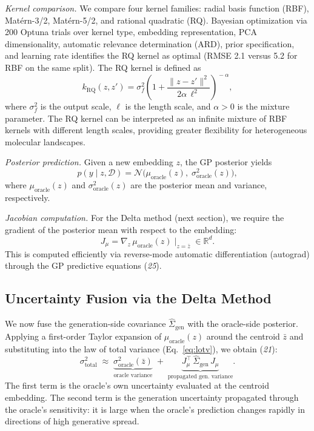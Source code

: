 \documentclass{article}
\newcommand{\Uoracle}{\sigma^{2}_{\mathrm{oracle}}}
\newcommand{\Utotal}{\sigma^{2}_{\mathrm{total}}}
\newcommand{\muoracle}{\mu_{\mathrm{oracle}}}
\newcommand{\Siggen}{\hat{\Sigma}_{\mathrm{gen}}}
\newcommand{\zbar}{\bar{z}}
\newcommand{\Rreal}{\mathbb{R}}
\newcommand{\Jmu}{J_{\mu}}
\newcommand{\scite}[1]{(\textit{#1})}
\begin{document}
\textit{Kernel comparison.}
We compare four kernel families: radial basis function (RBF),
Mat\'ern-3/2, Mat\'ern-5/2, and rational quadratic (RQ).  Bayesian
optimization via 200 Optuna trials over kernel type, embedding
representation, PCA dimensionality, automatic relevance determination
(ARD), prior specification, and learning rate identifies the RQ kernel as
optimal (RMSE 2.1 versus 5.2 for RBF on the same split).  The RQ kernel
is defined as
\begin{equation}
  k_{\mathrm{RQ}}(z,z')
  = \sigma_{f}^{2}\!
    \left(1 + \frac{\|z - z'\|^{2}}{2\alpha\,\ell^{2}}\right)^{\!-\alpha},
  \label{eq:rq}
\end{equation}
where $\sigma_{f}^{2}$ is the output scale, $\ell$ is the length scale,
and $\alpha > 0$ is the mixture parameter.  The RQ kernel can be
interpreted as an infinite mixture of RBF kernels with different length
scales, providing greater flexibility for heterogeneous molecular
landscapes.

\textit{Posterior prediction.}
Given a new embedding $z$, the GP posterior yields
\begin{equation}
  p(y \mid z, \mathcal{D})
  = \mathcal{N}\!\bigl(\muoracle(z),\;\Uoracle(z)\bigr),
  \label{eq:gp_post}
\end{equation}
where $\muoracle(z)$ and $\Uoracle(z)$ are the posterior mean and
variance, respectively.

\textit{Jacobian computation.}
For the Delta method (next section), we require the gradient of the
posterior mean with respect to the embedding:
\begin{equation}
  \Jmu = \nabla_{z}\,\muoracle(z)\;\Big|_{z=\zbar}\;\in \Rreal^{d}.
  \label{eq:jacobian}
\end{equation}
This is computed efficiently via reverse-mode automatic differentiation
(autograd) through the GP predictive equations \scite{25}.

\subsection{Uncertainty Fusion via the Delta Method}

We now fuse the generation-side covariance $\Siggen$ with the
oracle-side posterior.  Applying a first-order Taylor expansion of
$\muoracle(z)$ around the centroid $\zbar$ and substituting into the law
of total variance (Eq.~\ref{eq:lotv}), we obtain \scite{21}:
\begin{equation}
  \Utotal
  \;\approx\;
  \underbrace{\Uoracle(\zbar)}_{\text{oracle variance}}
  \;+\;
  \underbrace{\Jmu^{\!\top}\,\Siggen\,\Jmu}_{\text{propagated gen.\ variance}}.
  \label{eq:fusion}
\end{equation}
The first term is the oracle's own uncertainty evaluated at the centroid
embedding.  The second term is the generation uncertainty propagated
through the oracle's sensitivity: it is large when the oracle's
prediction changes rapidly in directions of high generative spread.
\end{document}
